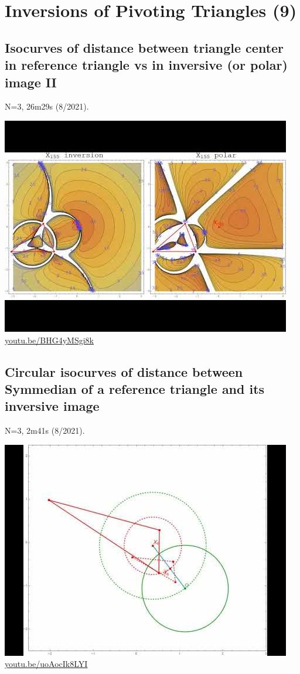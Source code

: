 \documentclass[12pt]{amsart}
\begin{document}
\section{Inversions of Pivoting Triangles (9)}

\subsection{Isocurves of distance between triangle center in reference triangle vs in inversive (or polar) image II}
\label{vid:BHG4yMSgi8k}
\noindent N=3, 26m29s (8/2021). 
\begin{center}\includegraphics[width=.5\textwidth]{pics/BHG4yMSgi8k.jpg} \\ 
\href{https://youtu.be/BHG4yMSgi8k}{\url{youtu.be/BHG4yMSgi8k}}\end{center}
% 
\subsection{Circular isocurves of distance between Symmedian of a reference triangle and its inversive image}
\label{vid:uoAocIk8LYI}
\noindent N=3, 2m41s (8/2021). 
\begin{center}\includegraphics[width=.5\textwidth]{pics/uoAocIk8LYI.jpg} \\ 
\href{https://youtu.be/uoAocIk8LYI}{\url{youtu.be/uoAocIk8LYI}}\end{center}
% 
\end{document}
